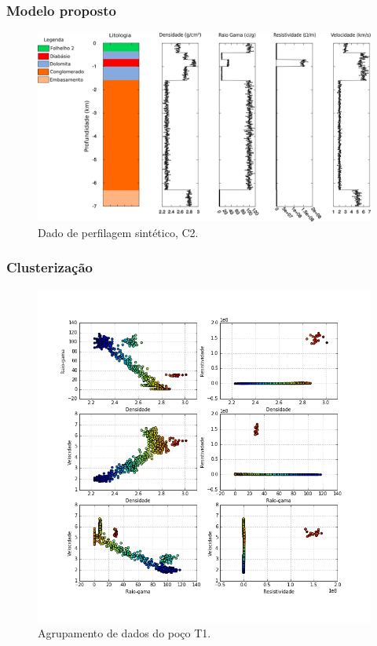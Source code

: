 \documentclass[10pt]{beamer} %
\begin{document}
\begin{frame}
	\frametitle{Modelo proposto}
	\begin{figure}[H]
		\centering
			\includegraphics[scale=0.37]{Imagens/PocoC2.png}
		\caption{Dado de perfilagem sintético, C2.}
		\label{C2}
	\end{figure}
\end{frame}


\begin{frame}
	\frametitle{Clusterização}
	\begin{figure}[H]
		\centering
			\includegraphics[scale=0.3]{Imagens/cluterpocoT1.png}
		\caption{Agrupamento de dados do poço T1.}
		\label{clusterT1}
	\end{figure} 
\end{frame}
\end{document}
